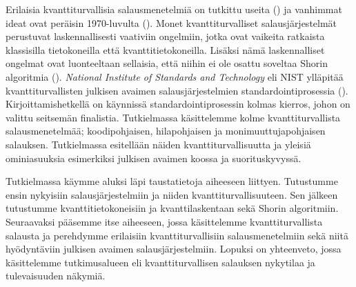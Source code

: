 Erilaisia kvanttiturvallisia salausmenetelmiä on tutkittu useita (\cite{mavroeidis2018impact}) ja vanhimmat ideat ovat peräisin 1970-luvulta (\cite{repka2014overview}). Monet kvanttiturvalliset salausjärjestelmät perustuvat laskennallisesti vaativiin ongelmiin, jotka ovat vaikeita ratkaista klassisilla tietokoneilla että kvanttitietokoneilla. %
 Lisäksi nämä laskennalliset ongelmat ovat luonteeltaan sellaisia, että niihin ei ole osattu soveltaa Shorin algoritmia (\cite{bernstein2017post}). \emph{National Institute of Standards and Technology} eli NIST ylläpitää kvanttiturvallisten julkisen avaimen salausjärjestelmien standardointiprosessia (\cite{alagic2020status}). Kirjoittamishetkellä on käynnissä standardointiprosessin kolmas kierros, johon on valittu seitsemän finalistia. Tutkielmassa käsittelemme kolme kvanttiturvallista salausmenetelmää; koodipohjaisen, hilapohjaisen ja monimuuttujapohjaisen salauksen. Tutkielmassa esitellään näiden kvanttiturvallisuutta ja yleisiä ominiasuuksia esimerkiksi julkisen avaimen koossa ja suorituskyvyssä.
 
Tutkielmassa käymme aluksi läpi taustatietoja aiheeseen liittyen. Tutustumme ensin nykyisiin salausjärjestelmiin ja niiden kvanttiturvallisuuteen. Sen jälkeen tutustumme kvanttitietokoneisiin ja kvanttilaskentaan sekä Shorin algoritmiin. Seuraavaksi pääsemme itse aiheeseen, jossa käsittelemme kvanttiturvallista salausta ja perehdymme erilaisiin kvanttiturvallisiin salausmenetelmiin sekä niitä hyödyntäviin julkisen avaimen salausjärjestelmiin. Lopuksi on yhteenveto, jossa käsittelemme tutkimusalueen eli kvanttiturvallisen salauksen nykytilaa ja tulevaisuuden näkymiä.